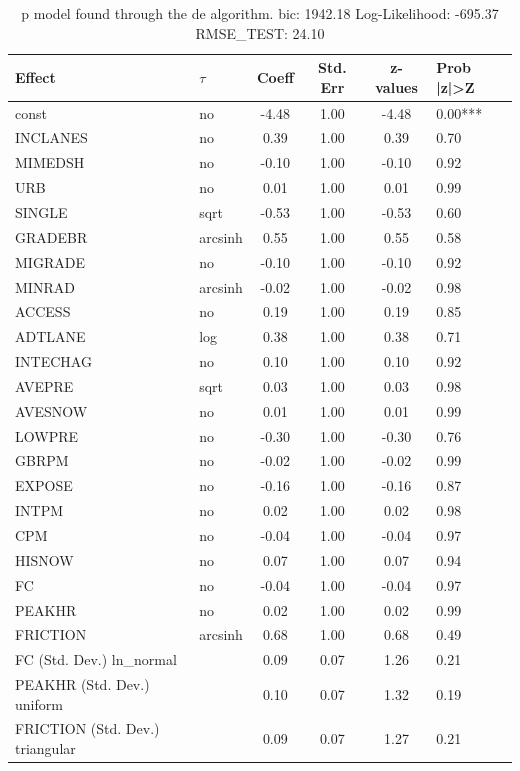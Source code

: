 \begin{table}
	\caption{p model found through the de algorithm. bic: 1942.18 Log-Likelihood: -695.37 RMSE_TEST: 24.10}
	\begin{center}
		\begin{tabular}{|l|l|c|c|c|l|}
			\hline
			Effect & $\tau$ & Coeff & Std. Err & z-values & Prob |z|>Z \\
			\hline
			const & no & -4.48 & 1.00 & -4.48 & 0.00*** \\
			\hline
			INCLANES & no & 0.39 & 1.00 & 0.39 & 0.70 \\
			\hline
			MIMEDSH & no & -0.10 & 1.00 & -0.10 & 0.92 \\
			\hline
			URB & no & 0.01 & 1.00 & 0.01 & 0.99 \\
			\hline
			SINGLE & sqrt & -0.53 & 1.00 & -0.53 & 0.60 \\
			\hline
			GRADEBR & arcsinh & 0.55 & 1.00 & 0.55 & 0.58 \\
			\hline
			MIGRADE & no & -0.10 & 1.00 & -0.10 & 0.92 \\
			\hline
			MINRAD & arcsinh & -0.02 & 1.00 & -0.02 & 0.98 \\
			\hline
			ACCESS & no & 0.19 & 1.00 & 0.19 & 0.85 \\
			\hline
			ADTLANE & log & 0.38 & 1.00 & 0.38 & 0.71 \\
			\hline
			INTECHAG & no & 0.10 & 1.00 & 0.10 & 0.92 \\
			\hline
			AVEPRE & sqrt & 0.03 & 1.00 & 0.03 & 0.98 \\
			\hline
			AVESNOW & no & 0.01 & 1.00 & 0.01 & 0.99 \\
			\hline
			LOWPRE & no & -0.30 & 1.00 & -0.30 & 0.76 \\
			\hline
			GBRPM & no & -0.02 & 1.00 & -0.02 & 0.99 \\
			\hline
			EXPOSE & no & -0.16 & 1.00 & -0.16 & 0.87 \\
			\hline
			INTPM & no & 0.02 & 1.00 & 0.02 & 0.98 \\
			\hline
			CPM & no & -0.04 & 1.00 & -0.04 & 0.97 \\
			\hline
			HISNOW & no & 0.07 & 1.00 & 0.07 & 0.94 \\
			\hline
			FC & no & -0.04 & 1.00 & -0.04 & 0.97 \\
			\hline
			PEAKHR & no & 0.02 & 1.00 & 0.02 & 0.99 \\
			\hline
			FRICTION & arcsinh & 0.68 & 1.00 & 0.68 & 0.49 \\
			\hline
			FC (Std. Dev.) ln_normal &  & 0.09 & 0.07 & 1.26 & 0.21 \\
			\hline
			PEAKHR (Std. Dev.) uniform &  & 0.10 & 0.07 & 1.32 & 0.19 \\
			\hline
			FRICTION (Std. Dev.) triangular &  & 0.09 & 0.07 & 1.27 & 0.21 \\
			\hline
		\end{tabular}
	\end{center}
\end{table}